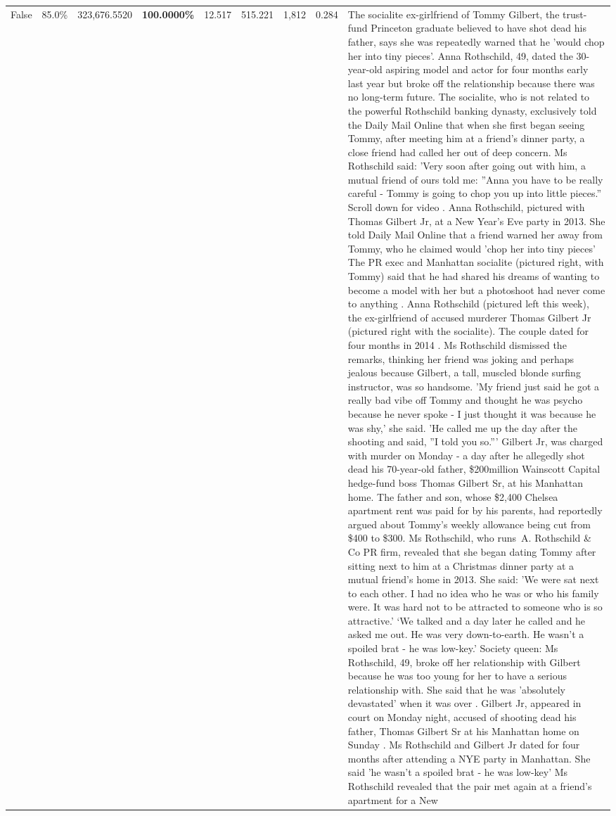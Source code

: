 \begin{table}[H]
\begin{tabular}{lllrlllll}
False & 85.0\% & 323,676.5520 & \bfseries \color{red} 100.0000\% & 12.517 & 515.221 & 1,812 & 0.284 & The socialite ex-girlfriend of Tommy Gilbert, the trust-fund Princeton graduate believed to have shot dead his father, says she was repeatedly warned that he 'would chop her into tiny pieces'. Anna Rothschild, 49, dated the 30-year-old aspiring model and actor for four months early last year but broke off the relationship because there was no long-term future. The socialite, who is not related to the powerful Rothschild banking dynasty, exclusively told the Daily Mail Online that when she first began seeing Tommy, after meeting him at a friend's dinner party, a close friend had called her out of deep concern. Ms Rothschild said: 'Very soon after going out with him, a mutual friend of ours told me: ''Anna you have to be really careful - Tommy is going to chop you up into little pieces.'' Scroll down for video . Anna Rothschild, pictured with Thomas Gilbert Jr, at a New Year's Eve party in 2013. She told Daily Mail Online that a friend warned her away from Tommy, who he claimed would 'chop her into tiny pieces' The PR exec and Manhattan socialite (pictured right, with Tommy) said that he had shared his dreams of wanting to become a model with her but a photoshoot had never come to anything . Anna Rothschild (pictured left this week), the ex-girlfriend of accused murderer Thomas Gilbert Jr (pictured right with the socialite). The couple dated for four months in 2014 . Ms Rothschild dismissed the remarks, thinking her friend was joking and perhaps jealous because Gilbert, a tall, muscled blonde surfing instructor, was so handsome. 'My friend just said he got a really bad vibe off Tommy and thought he was psycho because he never spoke - I just thought it was because he was shy,' she said. 'He called me up the day after the shooting and said, ''I told you so.''' Gilbert Jr, was charged with murder on Monday - a day after he allegedly shot dead his 70-year-old father, \$200million Wainscott Capital hedge-fund boss Thomas Gilbert Sr, at his Manhattan home. The father and son, whose \$2,400 Chelsea apartment rent was paid for by his parents, had reportedly argued about Tommy's weekly allowance being cut from \$400 to \$300. Ms Rothschild, who runs A. Rothschild \& Co PR firm, revealed that she began dating Tommy after sitting next to him at a Christmas dinner party at a mutual friend's home in 2013. She said: 'We were sat next to each other. I had no idea who he was or who his family were. It was hard not to be attracted to someone who is so attractive.' ‘We talked and a day later he called and he asked me out. He was very down-to-earth. He wasn’t a spoiled brat - he was low-key.’ Society queen: Ms Rothschild, 49, broke off her relationship with Gilbert because he was too young for her to have a serious relationship with. She said that he was 'absolutely devastated' when it was over . Gilbert Jr, appeared in court on Monday night, accused of shooting dead his father, Thomas Gilbert Sr at his Manhattan home on Sunday . Ms Rothschild and Gilbert Jr dated for four months after attending a NYE party in Manhattan. She said 'he wasn't a spoiled brat - he was low-key' Ms Rothschild revealed that the pair met again at a friend’s apartment for a New 
\end{tabular}
\end{table}
